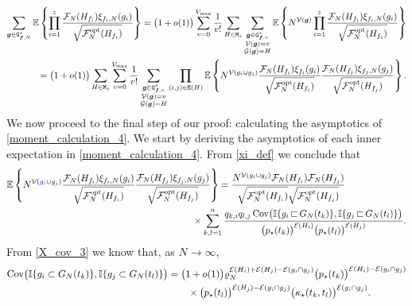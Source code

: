 \documentclass[11pt,reqno]{amsart}
\numberwithin{equation}{section}
\newcommand{\E}[1]{\mathbb{E}\left\{ #1\right\}}
\newcommand{\CNB}[1]{{\color{blue}#1}}
\newcommand{\kb}[1]{\boldsymbol{#1}}
\newcommand{\vk}[1]{\kb{#1}}
\begin{document}
\begin{align}
    \sum_{\vk g\in{\tt G}^{\star}_{\vk f,N}}\E{\prod_{i=1}^{z}\frac{\mathcal{F}_{{N}}({H}_{f_i})\xi_{f_i,{N}}(g_i)}{\sqrt{\mathcal{F}^{\rm opt}_N({H}_{f_i})}}}={\bigl(1+o(1)\bigr)}\sum_{v=0}^{V_{\max}}\frac{1}{v!}\sum_{{H}\in{\tt M}_z}\sum_{\substack{\vk g\in{\tt G}^{\star}_{\vk f,v}\\
     \mathcal{V}\left(\vk g\right) = v \\ \mathcal{G}(\vk g)={H}}}\E{N^{\mathcal{V}(\vk{g})}\prod_{i=1}^{z}\frac{\mathcal{F}_{{N}}({H}_{f_i})\xi_{f_i,{N}}(g_i)}{\sqrt{\mathcal{F}^{\rm opt}_N({H}_{f_i})}}}\notag\\
     = {\bigl(1+o(1)\bigr)}\sum_{{H}\in{\tt M}_z}\sum_{v=0}^{V_{\max}}\frac{1}{v!}\sum_{\substack{\vk g\in{\tt G}^{\star}_{\vk f,v}\\
     \mathcal{V}\left(\vk g\right) = v \\ \mathcal{G}(\vk g)={H}}}\prod_{(i,j)\in{\tt E}({H})}\E{N^{\mathcal{V}(g_i\cup g_j)}\frac{\mathcal{F}_{{N}}({H}_{f_i})\xi_{f_i}(g_i)}{\sqrt{\mathcal{F}^{\rm opt}_N({H}_{f_i})}}\frac{\mathcal{F}_{{N}}({H}_{f_j})\xi_{f_j,{N}}(g_j)}{\sqrt{\mathcal{F}^{\rm opt}_N({H}_{f_j})}}}.\label{moment_calculation_4}
\end{align}
{We now proceed to the final step of our proof: calculating the asymptotics of \eqref{moment_calculation_4}. We start by deriving the asymptotics of each inner expectation in \eqref{moment_calculation_4}.} From \eqref{xi_def} we conclude that
\begin{align}
    \E{N^{\mathcal{V}(\CNB{g_i}\cup g_j)}\frac{\mathcal{F}_{{N}}({H}_{f_i})\xi_{f_i,{N}}(g_i)}{\sqrt{\mathcal{F}^{\rm opt}_N({H}_{f_i})}}\frac{\mathcal{F}_{{N}}({H}_{f_j})\xi_{f_j,{N}}(g_j)}{\sqrt{\mathcal{F}^{\rm opt}_N({H}_{f_j})}}} &= \frac{N^{\mathcal{V}(g_i\cup g_j)}\mathcal{F}_{{N}}({H}_{f_i})\mathcal{F}_{{N}}({H}_{f_j})}{\sqrt{\mathcal{F}^{\rm opt}_N({H}_{f_i})}\sqrt{\mathcal{F}^{\rm opt}_N({H}_{f_j})}}\notag\\&\hspace{-10mm}
\times\sum_{k,l=1}^{n}\frac{q_{k,i}q_{l,j}\operatorname{Cov}\bigl(\mathbb{I}\{g_i{\,\sqsubset\,} G_N(t_{k})\},\mathbb{I}\{g_j{\,\sqsubset\,}G_N(t_{l})\}\bigr)}{\bigl(p_{\star}(t_{k})\bigr)^{\mathcal{E}({H}_i)}\bigl(p_{\star}(t_{l})\bigr)^{\mathcal{E}({H}_j)}}.\label{moment_calculation_5}
\end{align}
From \eqref{X_cov_3} we know that, as $N\to\infty$,
\begin{align*}
    \operatorname{Cov}\bigl(\mathbb{I}\{g_i\subset G_N(t_{k})\},\mathbb{I}\{g_j\subset G_N(t_{l})\}\bigr)&={\bigr(1+o(1)\bigl)} \varrho_N^{\mathcal{E}({H}_i) + \mathcal{E}({H}_j) - \mathcal{E}(g_i\cap g_j)}\bigl(p_{\star}({t_k})\bigr)^{\mathcal{E}({H}_i) - \mathcal{E}(g_i\cap g_j)}\notag\\
    &\qquad\times\bigl(p_{\star}({t_l})\bigr)^{\mathcal{E}({H}_j) - \mathcal{E}(g_i\cap g_j)}\bigl(\kappa_{\star}({t_k,t_l})\bigr)^{\mathcal{E}(g_i\cap g_j)}.
\end{align*}
\end{document}
